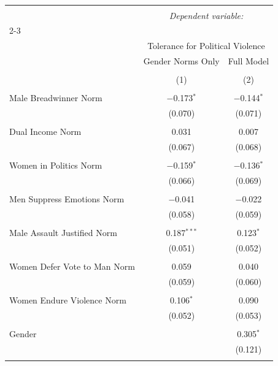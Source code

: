 
\begin{table}[!htbp] \centering 
  \caption{} 
  \label{} 
\begin{tabular}{@{\extracolsep{5pt}}lcc} 
\\[-1.8ex]\hline 
\hline \\[-1.8ex] 
 & \multicolumn{2}{c}{\textit{Dependent variable:}} \\ 
\cline{2-3} 
\\[-1.8ex] & \multicolumn{2}{c}{Tolerance for Political Violence} \\ 
 & Gender Norms Only & Full Model \\ 
\\[-1.8ex] & (1) & (2)\\ 
\hline \\[-1.8ex] 
 Male Breadwinner Norm & $-$0.173$^{*}$ & $-$0.144$^{*}$ \\ 
  & (0.070) & (0.071) \\ 
  & & \\ 
 Dual Income Norm & 0.031 & 0.007 \\ 
  & (0.067) & (0.068) \\ 
  & & \\ 
 Women in Politics Norm & $-$0.159$^{*}$ & $-$0.136$^{*}$ \\ 
  & (0.066) & (0.069) \\ 
  & & \\ 
 Men Suppress Emotions Norm & $-$0.041 & $-$0.022 \\ 
  & (0.058) & (0.059) \\ 
  & & \\ 
 Male Assault Justified Norm & 0.187$^{***}$ & 0.123$^{*}$ \\ 
  & (0.051) & (0.052) \\ 
  & & \\ 
 Women Defer Vote to Man Norm & 0.059 & 0.040 \\ 
  & (0.059) & (0.060) \\ 
  & & \\ 
 Women Endure Violence Norm & 0.106$^{*}$ & 0.090 \\ 
  & (0.052) & (0.053) \\ 
  & & \\ 
 Gender &  & 0.305$^{*}$ \\ 
  &  & (0.121) \\ 
  & & \\ 

\end{tabular}
\end{table}

